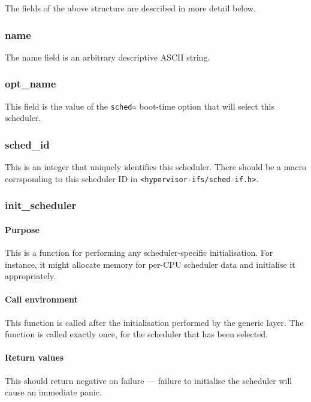 \documentclass[11pt,twoside,final,openright]{xenstyle}
\begin{document}
The fields of the above structure are described in more detail below.

\subsubsection{name}

The name field is an arbitrary descriptive ASCII string.

\subsubsection{opt\_name}

This field is the value of the {\tt sched=} boot-time option that will select
this scheduler.

\subsubsection{sched\_id}

This is an integer that uniquely identifies this scheduler.  There should be a
macro corrsponding to this scheduler ID in {\tt <hypervisor-ifs/sched-if.h>}.

\subsubsection{init\_scheduler}

\paragraph*{Purpose}

This is a function for performing any scheduler-specific initialisation.  For
instance, it might allocate memory for per-CPU scheduler data and initialise it
appropriately.

\paragraph*{Call environment}

This function is called after the initialisation performed by the generic
layer.  The function is called exactly once, for the scheduler that has been
selected.

\paragraph*{Return values}

This should return negative on failure --- failure to initialise the scheduler
will cause an immediate panic.
\end{document}
